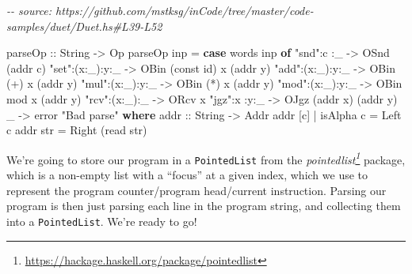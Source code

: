 \documentclass[]{article}
\newenvironment{Shaded}{}{}
\newcommand{\CommentTok}[1]{\textcolor[rgb]{0.38,0.63,0.69}{\textit{#1}}}
\newcommand{\DataTypeTok}[1]{\textcolor[rgb]{0.56,0.13,0.00}{#1}}
\newcommand{\FunctionTok}[1]{\textcolor[rgb]{0.02,0.16,0.49}{#1}}
\newcommand{\KeywordTok}[1]{\textcolor[rgb]{0.00,0.44,0.13}{\textbf{#1}}}
\newcommand{\NormalTok}[1]{#1}
\newcommand{\OperatorTok}[1]{\textcolor[rgb]{0.40,0.40,0.40}{#1}}
\newcommand{\OtherTok}[1]{\textcolor[rgb]{0.00,0.44,0.13}{#1}}
\newcommand{\StringTok}[1]{\textcolor[rgb]{0.25,0.44,0.63}{#1}}
\renewcommand{\href}[2]{#2\footnote{\url{#1}}}
\begin{document}
\begin{Shaded}
\begin{Highlighting}[]
\CommentTok{{-}{-} source: https://github.com/mstksg/inCode/tree/master/code{-}samples/duet/Duet.hs\#L39{-}L52}

\OtherTok{parseOp ::} \DataTypeTok{String} \OtherTok{{-}\textgreater{}} \DataTypeTok{Op}
\NormalTok{parseOp inp }\OtherTok{=} \KeywordTok{case} \FunctionTok{words}\NormalTok{ inp }\KeywordTok{of}
    \StringTok{"snd"}\OperatorTok{:}\NormalTok{c    }\OperatorTok{:}\NormalTok{\_   }\OtherTok{{-}\textgreater{}} \DataTypeTok{OSnd}\NormalTok{ (addr c)}
    \StringTok{"set"}\OperatorTok{:}\NormalTok{(x}\OperatorTok{:}\NormalTok{\_)}\OperatorTok{:}\NormalTok{y}\OperatorTok{:}\NormalTok{\_ }\OtherTok{{-}\textgreater{}} \DataTypeTok{OBin}\NormalTok{ (}\FunctionTok{const} \FunctionTok{id}\NormalTok{) x (addr y)}
    \StringTok{"add"}\OperatorTok{:}\NormalTok{(x}\OperatorTok{:}\NormalTok{\_)}\OperatorTok{:}\NormalTok{y}\OperatorTok{:}\NormalTok{\_ }\OtherTok{{-}\textgreater{}} \DataTypeTok{OBin}\NormalTok{ (}\OperatorTok{+}\NormalTok{)        x (addr y)}
    \StringTok{"mul"}\OperatorTok{:}\NormalTok{(x}\OperatorTok{:}\NormalTok{\_)}\OperatorTok{:}\NormalTok{y}\OperatorTok{:}\NormalTok{\_ }\OtherTok{{-}\textgreater{}} \DataTypeTok{OBin}\NormalTok{ (}\OperatorTok{*}\NormalTok{)        x (addr y)}
    \StringTok{"mod"}\OperatorTok{:}\NormalTok{(x}\OperatorTok{:}\NormalTok{\_)}\OperatorTok{:}\NormalTok{y}\OperatorTok{:}\NormalTok{\_ }\OtherTok{{-}\textgreater{}} \DataTypeTok{OBin} \FunctionTok{mod}\NormalTok{        x (addr y)}
    \StringTok{"rcv"}\OperatorTok{:}\NormalTok{(x}\OperatorTok{:}\NormalTok{\_)}\OperatorTok{:}\NormalTok{\_   }\OtherTok{{-}\textgreater{}} \DataTypeTok{ORcv}\NormalTok{ x}
    \StringTok{"jgz"}\OperatorTok{:}\NormalTok{x    }\OperatorTok{:}\NormalTok{y}\OperatorTok{:}\NormalTok{\_ }\OtherTok{{-}\textgreater{}} \DataTypeTok{OJgz}\NormalTok{ (addr x) (addr y)}
\NormalTok{    \_               }\OtherTok{{-}\textgreater{}} \FunctionTok{error} \StringTok{"Bad parse"}
  \KeywordTok{where}
\OtherTok{    addr ::} \DataTypeTok{String} \OtherTok{{-}\textgreater{}} \DataTypeTok{Addr}
\NormalTok{    addr [c] }\OperatorTok{|} \FunctionTok{isAlpha}\NormalTok{ c }\OtherTok{=} \DataTypeTok{Left}\NormalTok{ c}
\NormalTok{    addr str }\OtherTok{=} \DataTypeTok{Right}\NormalTok{ (}\FunctionTok{read}\NormalTok{ str)}
\end{Highlighting}
\end{Shaded}

We're going to store our program in a \texttt{PointedList} from the
\emph{\href{https://hackage.haskell.org/package/pointedlist}{pointedlist}}
package, which is a non-empty list with a ``focus'' at a given index, which we
use to represent the program counter/program head/current instruction. Parsing
our program is then just parsing each line in the program string, and collecting
them into a \texttt{PointedList}. We're ready to go!
\end{document}
